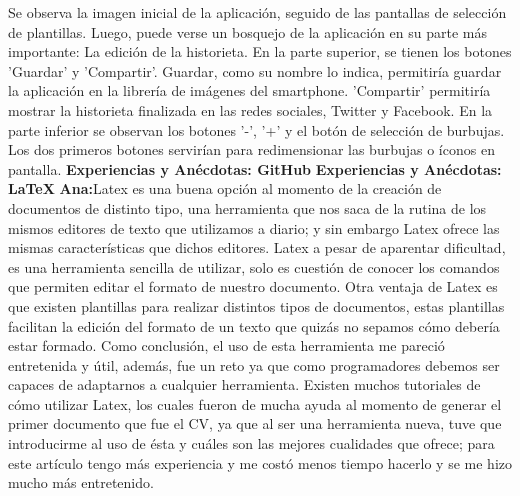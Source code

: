 \documentclass[12pt]{report}
\begin{document}
Se observa la imagen inicial de la aplicación, seguido de las pantallas de selección de plantillas. Luego, puede verse un bosquejo de la aplicación en su parte más importante: La edición de la historieta.
 \newline
 \newline
En la parte superior, se tienen los botones 'Guardar' y 'Compartir'. Guardar, como su nombre lo indica, permitiría guardar la aplicación en la librería de imágenes del smartphone. 'Compartir' permitiría mostrar la historieta finalizada en las redes sociales, Twitter y Facebook.
 \newline
 \newline
En la parte inferior se observan los botones '-', '+' y el botón de selección de burbujas. Los dos primeros botones servirían para redimensionar las burbujas o íconos en pantalla.
           \newline
           \newline
	\begingroup
		\large{
			\textbf{
			           \newline
			           \newline
				Experiencias y Anécdotas: GitHub
				\newline
				\newline
			}
		}
	\endgroup
	\newline
	\newline	
	\begingroup
		\large{
			\textbf{
				Experiencias y Anécdotas: LaTeX
				\newline
				\newline
			}
		}
	\endgroup
	\textbf{Ana:\newline\newline}Latex es una buena opción al momento de la creación de documentos de distinto tipo, una herramienta que nos saca de la rutina de los mismos editores de texto que utilizamos a diario; y sin embargo Latex ofrece las mismas características que dichos editores.
\newline	
\newline	
Latex  a pesar de aparentar dificultad, es una herramienta sencilla de utilizar, solo es cuestión de conocer los comandos que permiten editar el formato de nuestro documento.
Otra ventaja de Latex es que existen plantillas para realizar distintos tipos de documentos, estas plantillas facilitan la edición del formato de un texto que quizás no sepamos cómo debería estar formado.
\newline	
\newline	
Como conclusión, el uso de esta herramienta me pareció entretenida y útil, además, fue un reto ya que como programadores debemos ser capaces de adaptarnos a cualquier herramienta.
\newline
\newline		
Existen muchos tutoriales de cómo utilizar Latex, los cuales fueron de mucha ayuda al momento de generar el primer documento que fue el CV, ya que al ser una herramienta nueva, tuve que introducirme al uso de ésta y cuáles son las mejores cualidades que ofrece; para este artículo tengo más experiencia y me costó menos tiempo hacerlo y se me hizo mucho más entretenido.
\newline
\newline	
\end{document}
